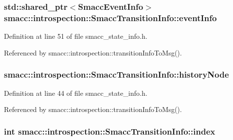 \subsubsection[{\texorpdfstring{event\+Info}{eventInfo}}]{\setlength{\rightskip}{0pt plus 5cm}std\+::shared\+\_\+ptr$<${\bf Smacc\+Event\+Info}$>$ smacc\+::introspection\+::\+Smacc\+Transition\+Info\+::event\+Info}\hypertarget{structsmacc_1_1introspection_1_1SmaccTransitionInfo_a573be95bb6fdeeae46fc5ed56b260138}{}\label{structsmacc_1_1introspection_1_1SmaccTransitionInfo_a573be95bb6fdeeae46fc5ed56b260138}


Definition at line 51 of file smacc\+\_\+state\+\_\+info.\+h.



Referenced by smacc\+::introspection\+::transition\+Info\+To\+Msg().

\subsubsection[{\texorpdfstring{history\+Node}{historyNode}}]{ smacc\+::introspection\+::\+Smacc\+Transition\+Info\+::history\+Node}\hypertarget{structsmacc_1_1introspection_1_1SmaccTransitionInfo_acbb8f7891dd0c541b26feb82149cb780}{}\label{structsmacc_1_1introspection_1_1SmaccTransitionInfo_acbb8f7891dd0c541b26feb82149cb780}


Definition at line 44 of file smacc\+\_\+state\+\_\+info.\+h.



Referenced by smacc\+::introspection\+::transition\+Info\+To\+Msg().

\subsubsection[{\texorpdfstring{index}{index}}]{\setlength{\rightskip}{0pt plus 5cm}int smacc\+::introspection\+::\+Smacc\+Transition\+Info\+::index}\hypertarget{structsmacc_1_1introspection_1_1SmaccTransitionInfo_a4b9e9f140aefd8ecd6697bcaa4b681af}{}\label{structsmacc_1_1introspection_1_1SmaccTransitionInfo_a4b9e9f140aefd8ecd6697bcaa4b681af}


